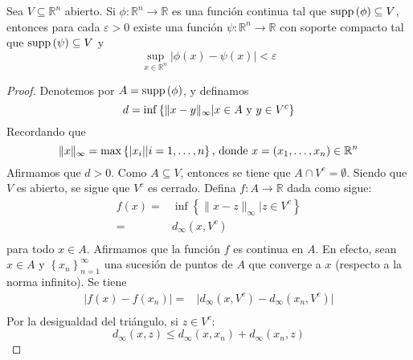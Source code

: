 \documentclass[12pt]{report}
\theoremstyle{largebreak}
\newcommand\abs[1]{\ensuremath{\lvert#1\rvert}}
\newcommand\cf[3]{\ensuremath{#1:#2\rightarrow#3}}
\newcommand\supp[1]{\ensuremath{\textup{supp}\left(#1\right)}}
\begin{document}
\setcounter{section}{5}
\setcounter{theor}{10}

\begin{theor}
    Sea $V\subseteq\mathbb{R}^n$ abierto. Si $\cf{\phi}{\mathbb{R}^n}{\mathbb{R}}$ es una función continua tal que $\supp{\phi}\subseteq V$, entonces para cada $\varepsilon>0$ existe una función $\cf{\psi}{\mathbb{R}^n}{\mathbb{R}}$ con soporte compacto tal que $\supp{\psi}\subseteq V$ y
    \begin{equation*}
        \sup_{x\in\mathbb{R}^n}\abs{\phi(x)-\psi(x)}<\varepsilon
    \end{equation*}
\end{theor}

\begin{proof}
    Denotemos por $A=\supp{\phi}$, y definamos
    \begin{equation*}
        d=\inf\left\{\|x-y\|_{\infty}|x\in A \textup{ y }y\in V^c\right\}
    \end{equation*}
    Recordando que 
    \begin{equation*}
        \|x\|_{\infty}=\max\left\{\abs{x_i}|i=1,\dots,n\right\}\textup{, donde }x=\left(x_1,\dots,x_n\right)\in\mathbb{R}^n
    \end{equation*}
    Afirmamos que $d>0$. Como $A\subseteq V$, entonces se tiene que $A\cap V^c=\emptyset$. Siendo que $V$ es abierto, se sigue que $V^c$ es cerrado. Defina $\cf{f}{A}{\mathbb{R}}$ dada como sigue:
    \begin{equation*}
        \begin{split}
            f(x)=&\inf\left\{\|x-z\|_{\infty}|z\in V^c\right\}\\
            =&d_\infty(x,V^c)\\
        \end{split}
    \end{equation*}
    para todo $x\in A$. Afirmamos que la función $f$ es continua en $A$. En efecto, sean $x\in A$ y $\left\{x_n\right\}_{n=1}^{\infty}$ una sucesión de puntos de $A$ que converge a $x$ (respecto a la norma infinito). Se tiene
    \begin{equation}
        \begin{split}
            \abs{f(x)-f(x_n)}=&\abs{d_\infty(x,V^c)-d_\infty(x_n,V^c)}\\
        \end{split}
    \end{equation}
    Por la desigualdad del triángulo, si $z\in V^c$:
    \begin{equation*}
        d_{\infty}(x,z)\leq d_{\infty}(x,x_n)+d_{\infty}(x_n,z)

\end{equation*}
\end{proof}
\end{document}
